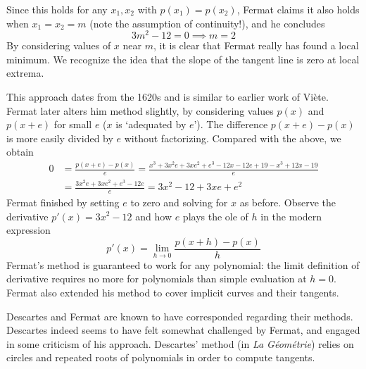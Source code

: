 Since this holds for any $x_1,x_2$ with $p(x_1)=p(x_2)$, Fermat claims it also holds when $x_1=x_2=m$ (note the assumption of continuity!), and he concludes
\[3m^2-12=0\implies m=2\]
By considering values of $x$ near $m$, it is clear that Fermat really has found a local minimum. We recognize the idea that the slope of the tangent line is zero at local extrema.
\smallbreak

This approach dates from the 1620s and is similar to earlier work of Viète. Fermat later alters him method slightly, by considering values $p(x)$ and $p(x+e)$ for small $e$ ($x$ is `adequated by $e$'). The difference $p(x+e)-p(x)$ is more easily divided by $e$ without factorizing. Compared with the above, we obtain
\begin{align*}
0&=\frac{p(x+e)-p(x)}{e} =\frac{x^3+3x^2e+3xe^2+e^3-12x-12e+19-x^3+12x-19}{e}\\
&=\frac{3x^2e+3xe^2+e^3-12e}{e} =3x^2-12 +3xe+e^2
\end{align*}
Fermat finished by setting $e$ to zero and solving for $x$ as before. Observe the derivative $p'(x)=3x^2-12$ and how $e$ plays the ole of $h$ in the modern expression
\[p'(x)=\lim_{h\to 0}\frac{p(x+h)-p(x)}h\]
Fermat's method is guaranteed to work for any polynomial: the limit definition of derivative requires no more for polynomials than simple evaluation at $h=0$. Fermat also extended his method to cover implicit curves and their tangents.
\goodbreak

\label{pg:descartesnormal}

Descartes and Fermat are known to have corresponded regarding their methods. Descartes indeed seems to have felt somewhat challenged by Fermat, and engaged in some criticism of his approach. Descartes' method (in \emph{La Géométrie}) relies on circles and repeated roots of polynomials in order to compute tangents.\smallbreak

